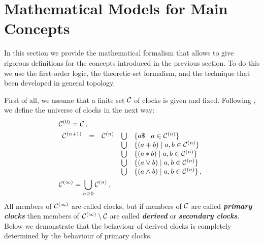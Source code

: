 \section{Mathematical Models for Main Concepts}
In this section we provide the mathematical formalism that allows to give rigorous definitions for the concepts introduced in the previous section.
To do this we use the first-order logic, the theoretic-set formalism, and the technique that been developed in general topology.

First of all, we assume that a finite set $\clocks$ of clocks is given and fixed.
Following \cite{bib:zhang}, we define the universe of clocks in the next way:
\begin{subequations}
\begin{align}
	&\clocks[0]   = \clocks\,,\\
	&\begin{array}{lclcl}
	\clocks[n+1] &=& \clocks[n] &\bigcup& \{a\$\mid a\in\clocks[n]\}\\
		         & &            &\bigcup& \{(a+b)\mid a,b\in\clocks[n]\}\\
		         & &            &\bigcup& \{(a\ast b)\mid a,b\in\clocks[n]\}\\
		         & &            &\bigcup& \{(a\vee b)\mid a,b\in\clocks[n]\}\\
		         & &            &\bigcup& \{(a\wedge b)\mid a,b\in\clocks[n]\}\,,
	\end{array}\\
	&\clocks[\infty] = \bigcup\limits_{n\geq 0}\clocks[n]\,.
\end{align}
\end{subequations}
All members of $\clocks[\infty]$ are called clocks, but if members of $\clocks$ are called {\it\bfseries primary clocks} then members of $\clocks[\infty]\setminus\clocks$ are called {\it\bfseries derived} or {\it\bfseries secondary clocks}.
Below we demonstrate that the behaviour of derived clocks is completely determined by the behaviour of primary clocks.

